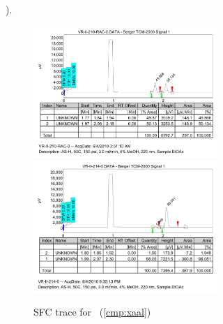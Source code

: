 ). \\
\begin{figure}[h]
\centering
\includegraphics[width=2.75in]{chp_asymmetric/images/sfc/xaal-rac.png}
\includegraphics[width=2.75in]{chp_asymmetric/images/sfc/xaal.png}
\caption{SFC trace for \CMPxaal~(\ref{cmp:xaal})}
\vspace{-10pt}
\end{figure}

